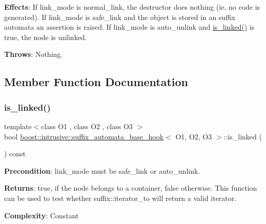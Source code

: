 {\bfseries Effects}\+: If link\+\_\+mode is {\ttfamily normal\+\_\+link}, the destructor does nothing (ie. no code is generated). If link\+\_\+mode is {\ttfamily safe\+\_\+link} and the object is stored in an suffix automata an assertion is raised. If link\+\_\+mode is {\ttfamily auto\+\_\+unlink} and {\ttfamily \hyperlink{classboost_1_1intrusive_1_1suffix__automata__base__hook_a4ea824934793a699459376ee845484f6}{is\+\_\+linked()}} is true, the node is unlinked.

{\bfseries Throws}\+: Nothing. 

\subsection{Member Function Documentation}
\mbox{\label{classboost_1_1intrusive_1_1suffix__automata__base__hook_a4ea824934793a699459376ee845484f6}} 
\subsubsection{\texorpdfstring{is\+\_\+linked()}{is\_linked()}}
{\footnotesize\ttfamily template$<$class O1 , class O2 , class O3 $>$ \\
bool \hyperlink{classboost_1_1intrusive_1_1suffix__automata__base__hook}{boost\+::intrusive\+::suffix\+\_\+automata\+\_\+base\+\_\+hook}$<$ O1, O2, O3 $>$\+::is\+\_\+linked (\begin{DoxyParamCaption}{ }\end{DoxyParamCaption}) const}

{\bfseries Precondition}\+: link\+\_\+mode must be {\ttfamily safe\+\_\+link} or {\ttfamily auto\+\_\+unlink}.

{\bfseries Returns}\+: true, if the node belongs to a container, false otherwise. This function can be used to test whether {\ttfamily suffix\+::iterator\+\_\+to} will return a valid iterator.

{\bfseries Complexity}\+: Constant \mbox{\label{classboost_1_1intrusive_1_1suffix__automata__base__hook_a5d52d6dc1f73d4df70df3eba344429e3}} 
